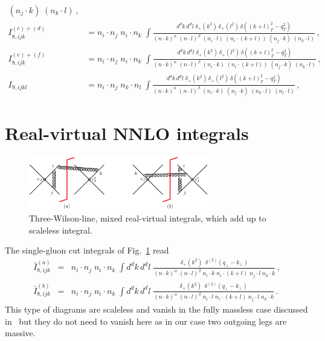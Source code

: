 \documentclass[a4paper,11pt]{report}
\numberwithin{equation}{section}
\begin{document}
\begin{subequations}
\begin{align}
{      (n_j \cdot k) \; (n_k \cdot l)} \, ,
    \\[0.7em]
    I_{8, ijk}^{(c)+(d)} &= 
    n_i \cdot n_j\; n_i \cdot n_k\; 
    \int 
    \frac{d^d k\, d^d l\;\delta_+(k^2)\, \delta_+(l^2)\,\delta((k+l)_T^2-q_T^2)}
      {(n \cdot k)^\alpha\; (n \cdot l)^\beta \; 
      (n_i \cdot l) \; (n_i \cdot (k+l)) \; 
      (n_j \cdot k) \; (n_k \cdot l)} \, ,
    \\[0.7em]
    I_{8, ijk}^{(e)+(f)} &= 
    n_i \cdot n_j\; n_i \cdot n_k\; 
    \int 
    \frac{d^d k\, d^d l\;\delta_+(k^2)\, \delta_+(l^2)\,\delta((k+l)_T^2-q_T^2)}
      {(n \cdot k)^\alpha\; (n \cdot l)^\beta \; 
      (n_i \cdot k) \; (n_i \cdot (k+l)) \; (n_j \cdot k) \; (n_k \cdot l)} \,,
    \\[0.7em]
    I_{9, ijkl} &= 
    n_i \cdot n_j\; n_k \cdot n_l\; 
    \int 
    \frac{d^d k\, d^d l\;\delta_+(k^2)\, \delta_+(l^2)\,\delta((k+l)_T^2-q_T^2)}
      {(n \cdot k)^\alpha\; (n \cdot l)^\beta \; 
      (n_i \cdot k) \; (n_j \cdot k) \; (n_k \cdot l) \; 
      (n_l \cdot l)} \, ,
  \end{align}
\end{subequations}

\section{Real-virtual NNLO integrals}

\begin{figure}[t]
  \begin{center}
    \includegraphics[width=0.7\textwidth]{plots/diagram4-pecjak.png}
  \end{center}
  \caption{
    Three-Wilson-line, mixed real-virtual integrals, which add up to scaleless
    integral.
  }
  \label{fig:pecjak4}
\end{figure}
%

The single-gluon cut integrals of Fig.~\ref{fig:pecjak4} read
%
\begin{eqnarray}
  \bar{I}_{8, ijk}^{(a)} &= &
  n_i \cdot n_j\; n_i \cdot n_k\; 
  \int d^d k\, d^d l\; 
  \frac{\delta_+(k^2) \,
    \; \delta^{(2)}(q_\perp-k_\perp)}
    {(n \cdot k)^\alpha\; (n \cdot l)^\beta \; 
    n_i \cdot k \; n_i \cdot (k+l) \; n_j \cdot l \; n_k \cdot k} \,,
  \\
  \bar{I}_{8, ijk}^{(b)} &= &
  n_i \cdot n_j\; n_i \cdot n_k\; 
  \int d^d k\, d^d l\; 
  \frac{\delta_+(k^2) \,
    \; \delta^{(2)}(q_\perp-k_\perp)}
    {(n \cdot k)^\alpha\; (n \cdot l)^\beta \; 
    n_i \cdot l \; n_i \cdot (k+l) \; n_j \cdot l \; n_k \cdot k} \,.
\end{eqnarray}
%
This type of diagrams are scaleless and vanish in the fully massless case
discussed in~\cite{Ferroglia:2012uy} but they do not need to vanish here as in
our case two outgoing legs are massive. 
\end{document}
